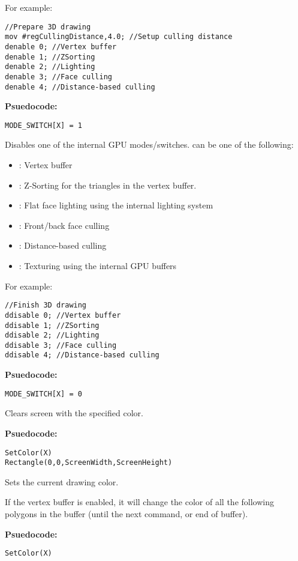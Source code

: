 For example:
\begin{verbatim}
//Prepare 3D drawing
mov #regCullingDistance,4.0; //Setup culling distance
denable 0; //Vertex buffer
denable 1; //ZSorting
denable 2; //Lighting
denable 3; //Face culling
denable 4; //Distance-based culling
\end{verbatim}

\textbf{Psuedocode:}
\begin{verbatim}
MODE_SWITCH[X] = 1
\end{verbatim}


Disables one of the internal GPU modes/switches.  can be one of the following:
\begin{itemize}
  \item {}: Vertex buffer
	\item {}: Z-Sorting for the triangles in the vertex buffer.
	\item {}: Flat face lighting using the internal lighting system
	\item {}: Front/back face culling
	\item {}: Distance-based culling
	\item {}: Texturing using the internal GPU buffers
\end{itemize}

For example:
\begin{verbatim}
//Finish 3D drawing
ddisable 0; //Vertex buffer
ddisable 1; //ZSorting
ddisable 2; //Lighting
ddisable 3; //Face culling
ddisable 4; //Distance-based culling
\end{verbatim}

\textbf{Psuedocode:}
\begin{verbatim}
MODE_SWITCH[X] = 0
\end{verbatim}


Clears screen with the specified color.

\textbf{Psuedocode:}
\begin{verbatim}
SetColor(X)
Rectangle(0,0,ScreenWidth,ScreenHeight)
\end{verbatim}


Sets the current drawing color.

If the vertex buffer is enabled, it will change the color of all the following polygons in the buffer (until the next  command, or end of buffer).

\textbf{Psuedocode:}
\begin{verbatim}
SetColor(X)
\end{verbatim}


